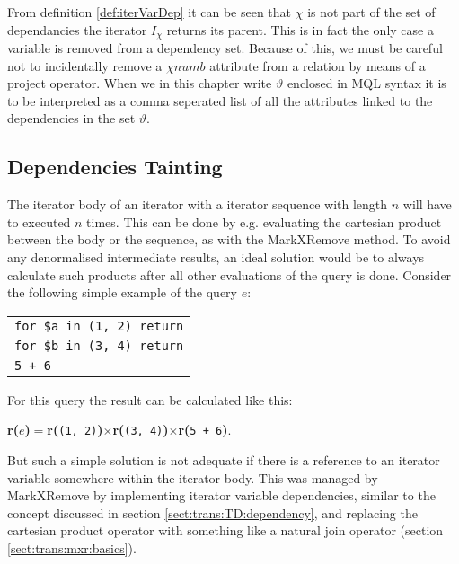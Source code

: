 From definition \ref{def:iterVarDep} it can be seen that $\chi$ is not part of the set of dependancies the iterator
$I_{\chi}$ returns its parent. This is in fact the only case a variable is removed from a dependency set.
Because of this, we must be careful not to incidentally remove a $\chi$$numb$ attribute from a relation by means
of a \textsf{project} operator. When we in this chapter write $\vartheta$ enclosed in MQL syntax it is to be
interpreted as a comma seperated list of all the attributes linked to the dependencies in the set $\vartheta$.

\subsection{Dependencies Tainting}
\label{sect:trans:TD:tainting}

The iterator body of an iterator with a iterator sequence with length $n$ will have to executed $n$ times. This
can be done by e.g. evaluating the cartesian product between the body or the sequence, as with the MarkXRemove
method. To avoid any denormalised intermediate results, an ideal solution would be to always calculate such
products after all other evaluations of the query is done. Consider the following simple example of the query $e$:

\begin{center}
\begin{tabular}{l}
\texttt{for \$a in (1, 2) return} \\ \qquad
\texttt{for \$b in (3, 4) return} \\ \qquad \qquad
\texttt{5 + 6}
\end{tabular}
\end{center}

For this query the result can be calculated like this:
\noindent
\begin{center}
\textbf{r(}$e$\textbf{)}$=$\textbf{r(}\texttt{(1, 2)}\textbf{)}$\times$\textbf{r(}\texttt{(3,
4)}\textbf{)}$\times$\textbf{r(}\texttt{5 + 6}\textbf{)}.
\end{center}
\noindent

But such a simple solution is not adequate if there is a reference to an iterator variable somewhere within the
iterator body. This was managed by MarkXRemove by implementing iterator variable dependencies, similar to the
concept discussed in section \ref{sect:trans:TD:dependency}, and replacing the cartesian product operator with
something like a natural join operator (section \ref{sect:trans:mxr:basics}).


